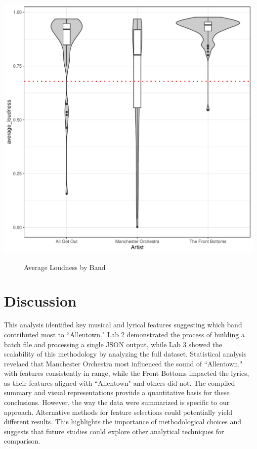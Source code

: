 \documentclass{article}\usepackage[]{graphicx}\usepackage[]{xcolor}
\makeatletter
\def\maxwidth{ %
  \ifdim\Gin@nat@width>\linewidth
    \linewidth
  \else
    \Gin@nat@width
  \fi
}
\newenvironment{knitrout}{}{} %
\makeatother
\begin{document}
\begin{multicols}{2}
\begin{knitrout}\scriptsize
{}\color{fgcolor}
\includegraphics[width=\maxwidth]{figure/plot1-1} 
\end{knitrout}

\begin{figure}[H]
\begin{center}

\caption{Average Loudness by Band}
\label{averageloudness} %
\end{center}
\end{figure}

\section{Discussion}
This analysis identified key musical and lyrical features suggesting which band contributed most to ``Allentown." Lab 2 demonstrated the process of building a batch file and processing a single JSON output, while Lab 3 showed the scalability of this methodology by analyzing the full dataset. Statistical analysis revelaed that Manchester Orchestra most influenced the sound of ``Allentown," with features consistently in range, while the Front Bottoms impacted the lyrics, as their features aligned with ``Allentown" and others did not. The compiled summary and visual representations proviide a quantitative basis for these conclusions. However, the way the data were summarized is specific to our approach. Alternative methods for feature selections could potentially yield different results. This highlights the importance of methodological choices and suggests that future studies could explore other analytical techniques for comparison.


\end{multicols}
\end{document}

